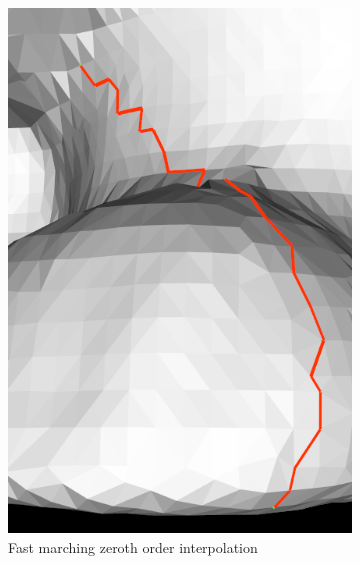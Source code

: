 \documentclass{InsightArticle}
\begin{document}
\begin{figure}
        \begin{subfigure}[b]{0.3\textwidth}
                \centering
                \includegraphics[width=\textwidth]{GeodesicPathFastMarchingZerothOrderInterp}
                \caption{Fast marching zeroth order interpolation}
                \label{fig:GeodesicPathFMMZerothOrder}
        \end{subfigure}
        ~ %
        \begin{subfigure}[b]{0.3\textwidth}
                \centering

\end{subfigure}
\end{figure}
\end{document}
